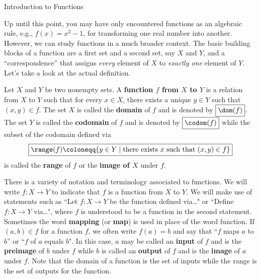 \begin{section}{Introduction to Functions}

Up until this point, you may have only encountered functions as an algebraic rule, e.g., $f(x)=x^{2}-1$, for transforming one real number into another.  However, we can study functions in a much broader context.  The basic building blocks of a function are a first set and a second set, say $X$ and $Y$, and a ``correspondence'' that assigns \emph{every} element of $X$ to \emph{exactly one} element of $Y$.  Let's take a look at the actual definition.

\begin{definition}\label{def:function}
Let $X$ and $Y$ be two nonempty sets.  A \textbf{function $f$ from $X$ to $Y$} is a relation from $X$ to $Y$ such that for every $x\in X$, there exists a unique $y\in Y$ such that $(x,y)\in f$. The set $X$ is called the \textbf{domain} of $f$ and is denoted by $\boxed{\dom(f)}$.  The set $Y$ is called the \textbf{codomain} of $f$ and is denoted by $\boxed{\codom(f)}$ while the subset of the codomain defined via
\[
\boxed{\range(f)\coloneqq \{y\in Y\mid \mbox{there exists }x\mbox{ such that } (x,y)\in f\}}
\]
is called the \textbf{range} of $f$ or the \textbf{image of $X$} under $f$.
\end{definition}

There is a variety of notation and terminology associated to functions. We will write $\boxed{f:X\to Y}$ to indicate that $f$ is a function from $X$ to $Y$. We will make use of statements such as ``Let $f:X\to Y$ be the function defined via\ldots" or ``Define $f:X\to Y$ via\ldots", where $f$ is understood to be a function in the second statement. Sometimes the word \textbf{mapping} (or \textbf{map}) is used in place of the word function.  If $(a,b)\in f$ for a function $f$, we often write $\boxed{f(a)=b}$ and say that ``$f$ maps $a$ to $b$'' or ``$f$ of $a$ equals $b$". In this case, $a$ may be called an \textbf{input} of $f$ and is the \textbf{preimage} of $b$ under $f$ while $b$ is called an \textbf{output} of $f$ and is the \textbf{image} of $a$ under $f$. Note that the domain of a function is the set of inputs while the range is the set of outputs for the function.
 


\end{section}
